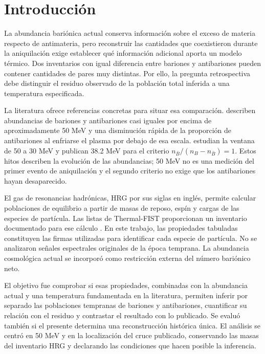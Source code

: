 \section{Introducción}
La abundancia bariónica actual conserva información sobre el exceso de materia respecto de antimateria, pero reconstruir las cantidades que coexistieron durante la aniquilación exige establecer qué información adicional aporta un modelo térmico. Dos inventarios con igual diferencia entre bariones y antibariones pueden contener cantidades de pares muy distintas. Por ello, la pregunta retrospectiva debe distinguir el residuo observado de la población total inferida a una temperatura especificada.

La literatura ofrece referencias concretas para situar esa comparación. \citet{Satarov2013} describen abundancias de bariones y antibariones casi iguales por encima de aproximadamente 50 MeV y una disminución rápida de la proporción de antibariones al enfriarse el plasma por debajo de esa escala. \citet{Yang2022} estudian la ventana de 50 a 30 MeV y publican 38.2 MeV para el criterio $n_{\bar B}/(n_B-n_{\bar B})=1$. Estos hitos describen la evolución de las abundancias; 50 MeV no es una medición del primer evento de aniquilación y el segundo criterio no exige que los antibariones hayan desaparecido.

El gas de resonancias hadrónicas, HRG por sus siglas en inglés, permite calcular poblaciones de equilibrio a partir de masas de reposo, espín y cargas de las especies de partícula. Las listas de Thermal-FIST proporcionan un inventario documentado para ese cálculo \citep{Vovchenko2019,TFLists2026}. En este trabajo, las propiedades tabuladas constituyen las firmas utilizadas para identificar cada especie de partícula. No se analizaron señales espectrales originales de la época temprana. La abundancia cosmológica actual se incorporó como restricción externa del número bariónico neto.

El objetivo fue comprobar si esas propiedades, combinadas con la abundancia actual y una temperatura fundamentada en la literatura, permiten inferir por separado las poblaciones tempranas de bariones y antibariones, cuantificar su relación con el residuo y contrastar el resultado con lo publicado. Se evaluó también si el presente determina una reconstrucción histórica única. El análisis se centró en 50 MeV y en la localización del cruce publicado, conservando las masas del inventario HRG y declarando las condiciones que hacen posible la inferencia.
